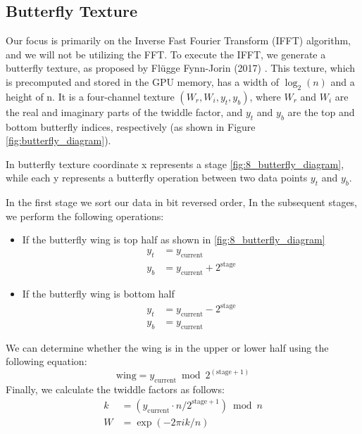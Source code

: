 \subsection{Butterfly Texture}

Our focus is primarily on the Inverse Fast Fourier Transform (IFFT) algorithm, and we will not be utilizing the FFT. To execute the IFFT, we generate a butterfly texture, as proposed by Fl{\"u}gge Fynn-Jorin (2017) \cite{flugge2017}. This texture, which is precomputed and stored in the GPU memory, has a width of $\log_2(n)$ and a height of n. It is a four-channel texture $(W_r,W_i,y_t,y_b)$, where $W_r$ and $W_i$ are the real and imaginary parts of the twiddle factor, and $y_t$ and $y_b$ are the top and bottom butterfly indices, respectively (as shown in Figure \ref{fig:butterfly_diagram}).

In butterfly texture coordinate x represents a stage \ref{fig:8_butterfly_diagram}, while each y represents a butterfly operation between two data points $y_t$ and $y_b$.

In the first stage we sort our data in bit reversed order, In the subsequent stages, we perform the following operations:
\begin{itemize}
    \item If the butterfly wing is top half as shown in \ref{fig:8_butterfly_diagram}
    \begin{equation}
        \begin{split}
            y_t &= y_{\text{current}} \\
            y_b &= y_{\text{current}} + 2^{\text{stage}}
        \end{split}
    \end{equation}
    \item If the butterfly wing is bottom half
    \begin{equation}
        \begin{split}
            y_t &= y_{\text{current}} - 2^{\text{stage}} \\
            y_b &= y_{\text{current}}
        \end{split}
    \end{equation}
\end{itemize}
We can determine whether the wing is in the upper or lower half using the following equation:
\begin{equation}
    \text{wing} = y_{\text{current}} \bmod 2^{(\text{stage} + 1)}
\end{equation}
Finally, we calculate the twiddle factors as follows:
\begin{equation}
    \begin{split}
        k &= (y_{\text{current}} \cdot n / 2^{\text{stage} + 1}) \bmod n \\
        W &= \exp(-2\pi i k / n)
    \end{split}
\end{equation}

